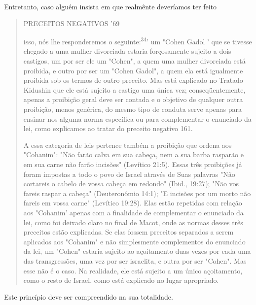 Entretanto, caso alguém insista em que realmênte deveríamos ter feito

\begin{quote}
PRECEITOS NEGATIVOS '69

isso, nós lhe responderemos o seguinte:\textsuperscript{34}' um "Cohen
Gadol ' que se tivesse chegado a uma mulher divorciada estaria
forçosamente sujeito a dois castigos, um por ser ele um "Cohen", a quem
uma mulher divorciada está proibida, e outro por ser um "Cohen Gadol", a
quem ela está igualmente proibida sob os termos de outro preceito. Mas
está explicado no Tratado Kidushin que ele está sujeito a castigo uma
única vez; conseqüentemente, apenas a proibição geral deve ser contada e
o objetivo de qualquer outra proibição, menos genérica, do mesmo tipo de
conduta serve apenas para ensinar-nos alguma norma espe­cífica ou para
complementar o enunciado da lei, como explicamos ao tratar do preceito
negativo 161.

A essa categoria de leis pertence também a proibição que ordena aos
"Cohanim": "Não farão calva em sua cabeça, nem a sua barba rasparão e em
sua carne não farão incisões" (Levítico 21:5). Essas três proibições já
foram im­postas a todo o povo de Israel através de Suas palavras "Não
cortareis o cabelo de vossa cabeça em redondo" (Ibid., 19:27); "Não vos
fareis raspar a cabeça" (Deuteronômio 14:1); "E incisões por um morto
não fareis em vossa carne" (Levítico 19:28). Elas estão repetidas com
relação aos "Cohanim' apenas com a finalidade de complementar o
enunciado da lei, como foi deixado claro no final de Macot, onde as
normas desses três preceitos estão explicadas. Se elas fossem preceitos
separados a serem aplicados aos "Cohanim" e não simples­mente
complementos do enunciado da lei, um "Cohen" estaria sujeito ao
açoi­tamento duas vezes por cada uma das transgressões, uma vez por ser
israelita, e outra por ser "Cohen". Mas esse não é o caso. Na realidade,
ele está sujeito a um único açoitamento, como o resto de Israel, como
está explicado no lugar apropriado.
\end{quote}

Este princípio deve ser compreendido na sua totalidade.

